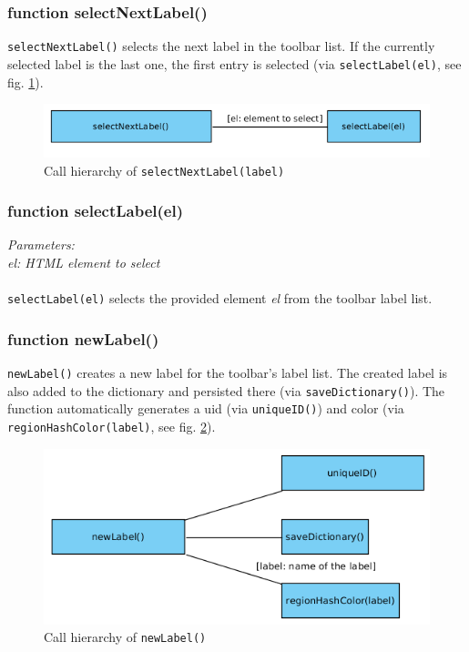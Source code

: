 \subsubsection{function selectNextLabel()}
\texttt{selectNextLabel()} selects the next label in the toolbar list. If the currently selected label is the last one, the first entry is selected (via \texttt{selectLabel(el)}, see fig. \ref{figB_selectNextl}).

\begin{figure}[H]
	\begin{center}
		\includegraphics[scale=0.5]{img/ch_selectNext.png}
		\caption{Call hierarchy of \texttt{selectNextLabel(label)}}
		\label{figB_selectNextl}
	\end{center}
\end{figure}


\subsubsection{function selectLabel(el)}
\emph{Parameters:\\
	el: HTML element to select\\ \\
}
\texttt{selectLabel(el)} selects the provided element \emph{el} from the toolbar label list.


\subsubsection{function newLabel()}
\texttt{newLabel()} creates a new label for the toolbar's label list. The created label is also added to the dictionary and persisted there (via \texttt{saveDictionary()}). The function automatically generates a uid (via \texttt{uniqueID()}) and color (via \texttt{regionHashColor(label)}, see fig. \ref{figB_newLabel}).

\begin{figure}[H]
	\begin{center}
		\includegraphics[scale=0.5]{img/ch_newLabel.png}
		\caption{Call hierarchy of \texttt{newLabel()}}
		\label{figB_newLabel}
	\end{center}
\end{figure}


